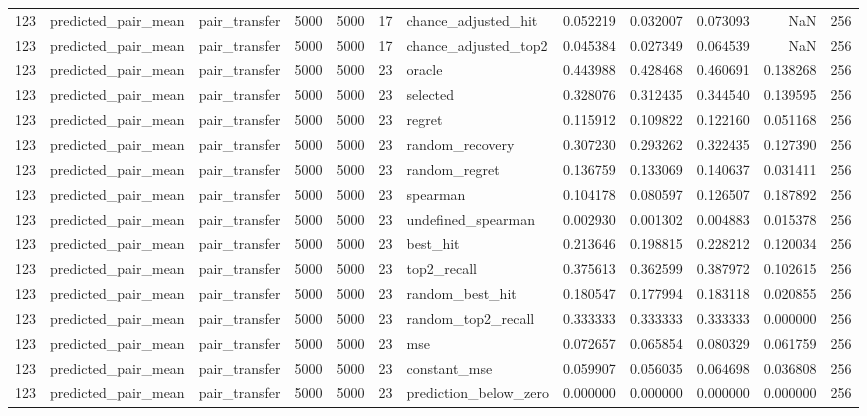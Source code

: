 \begin{tabular}{rllrrrlrrrrr}
123 & predicted_pair_mean & pair_transfer & 5000 & 5000 & 17 & chance_adjusted_hit & 0.052219 & 0.032007 & 0.073093 & NaN & 256 \\
123 & predicted_pair_mean & pair_transfer & 5000 & 5000 & 17 & chance_adjusted_top2 & 0.045384 & 0.027349 & 0.064539 & NaN & 256 \\
123 & predicted_pair_mean & pair_transfer & 5000 & 5000 & 23 & oracle & 0.443988 & 0.428468 & 0.460691 & 0.138268 & 256 \\
123 & predicted_pair_mean & pair_transfer & 5000 & 5000 & 23 & selected & 0.328076 & 0.312435 & 0.344540 & 0.139595 & 256 \\
123 & predicted_pair_mean & pair_transfer & 5000 & 5000 & 23 & regret & 0.115912 & 0.109822 & 0.122160 & 0.051168 & 256 \\
123 & predicted_pair_mean & pair_transfer & 5000 & 5000 & 23 & random_recovery & 0.307230 & 0.293262 & 0.322435 & 0.127390 & 256 \\
123 & predicted_pair_mean & pair_transfer & 5000 & 5000 & 23 & random_regret & 0.136759 & 0.133069 & 0.140637 & 0.031411 & 256 \\
123 & predicted_pair_mean & pair_transfer & 5000 & 5000 & 23 & spearman & 0.104178 & 0.080597 & 0.126507 & 0.187892 & 256 \\
123 & predicted_pair_mean & pair_transfer & 5000 & 5000 & 23 & undefined_spearman & 0.002930 & 0.001302 & 0.004883 & 0.015378 & 256 \\
123 & predicted_pair_mean & pair_transfer & 5000 & 5000 & 23 & best_hit & 0.213646 & 0.198815 & 0.228212 & 0.120034 & 256 \\
123 & predicted_pair_mean & pair_transfer & 5000 & 5000 & 23 & top2_recall & 0.375613 & 0.362599 & 0.387972 & 0.102615 & 256 \\
123 & predicted_pair_mean & pair_transfer & 5000 & 5000 & 23 & random_best_hit & 0.180547 & 0.177994 & 0.183118 & 0.020855 & 256 \\
123 & predicted_pair_mean & pair_transfer & 5000 & 5000 & 23 & random_top2_recall & 0.333333 & 0.333333 & 0.333333 & 0.000000 & 256 \\
123 & predicted_pair_mean & pair_transfer & 5000 & 5000 & 23 & mse & 0.072657 & 0.065854 & 0.080329 & 0.061759 & 256 \\
123 & predicted_pair_mean & pair_transfer & 5000 & 5000 & 23 & constant_mse & 0.059907 & 0.056035 & 0.064698 & 0.036808 & 256 \\
123 & predicted_pair_mean & pair_transfer & 5000 & 5000 & 23 & prediction_below_zero & 0.000000 & 0.000000 & 0.000000 & 0.000000 & 256 \\

\end{tabular}
